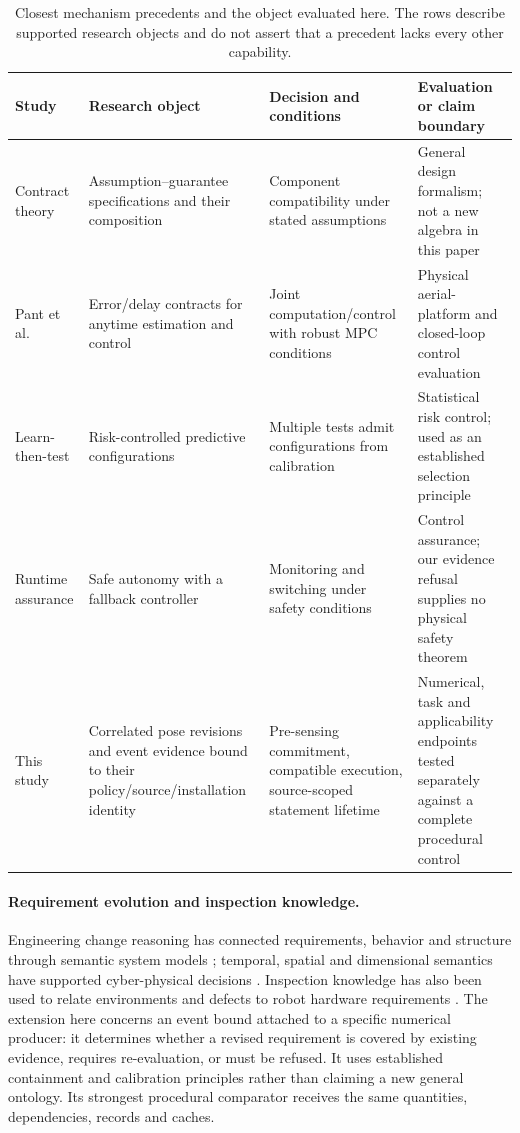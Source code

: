 \begin{table}[t]\centering\footnotesize
\caption{Closest mechanism precedents and the object evaluated here. The rows describe supported research objects and do not assert that a precedent lacks every other capability.}\label{tab:mechanism-precedents}
\begin{tabularx}{\linewidth}{@{}p{.20\linewidth}XXX@{}}\toprule
Study & Research object & Decision and conditions & Evaluation or claim boundary\\\midrule
Contract theory \cite{benveniste2018contracts} & Assumption--guarantee specifications and their composition & Component compatibility under stated assumptions & General design formalism; not a new algebra in this paper\\
Pant et al. \cite{pant2021} & Error/delay contracts for anytime estimation and control & Joint computation/control with robust MPC conditions & Physical aerial-platform and closed-loop control evaluation\\
Learn-then-test \cite{angelopoulos2025ltt} & Risk-controlled predictive configurations & Multiple tests admit configurations from calibration & Statistical risk control; used as an established selection principle\\
Runtime assurance \cite{mehmood2022simplex} & Safe autonomy with a fallback controller & Monitoring and switching under safety conditions & Control assurance; our evidence refusal supplies no physical safety theorem\\
This study & Correlated pose revisions and event evidence bound to their policy/source/installation identity & Pre-sensing commitment, compatible execution, source-scoped statement lifetime & Numerical, task and applicability endpoints tested separately against a complete procedural control\\\bottomrule
\end{tabularx}
\end{table}

\paragraph{Requirement evolution and inspection knowledge.}
Engineering change reasoning has connected requirements, behavior and structure through semantic system models \cite{wang2018change}; temporal, spatial and dimensional semantics have supported cyber-physical decisions \cite{petnga2016}. Inspection knowledge has also been used to relate environments and defects to robot hardware requirements \cite{ma2023inspection}. The extension here concerns an event bound attached to a specific numerical producer: it determines whether a revised requirement is covered by existing evidence, requires re-evaluation, or must be refused. It uses established containment and calibration principles rather than claiming a new general ontology. Its strongest procedural comparator receives the same quantities, dependencies, records and caches.

